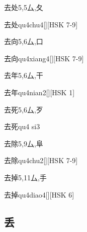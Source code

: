 \begin{Entry}{去处}{5,5}{⼛,⼡}
  \begin{Phonetics}{去处}{qu4chu4}[][HSK 7-9]
  \end{Phonetics}
\end{Entry}

\begin{Entry}{去向}{5,6}{⼛,⼝}
  \begin{Phonetics}{去向}{qu4xiang4}[][HSK 7-9]
  \end{Phonetics}
\end{Entry}

\begin{Entry}{去年}{5,6}{⼛,⼲}
  \begin{Phonetics}{去年}{qu4nian2}[][HSK 1]
  \end{Phonetics}
\end{Entry}

\begin{Entry}{去死}{5,6}{⼛,⽍}
  \begin{Phonetics}{去死}{qu4 si3}
  \end{Phonetics}
\end{Entry}

\begin{Entry}{去除}{5,9}{⼛,⾩}
  \begin{Phonetics}{去除}{qu4chu2}[][HSK 7-9]
  \end{Phonetics}
\end{Entry}

\begin{Entry}{去掉}{5,11}{⼛,⼿}
  \begin{Phonetics}{去掉}{qu4diao4}[][HSK 6]
  \end{Phonetics}
\end{Entry}

\subsection*{丢}

